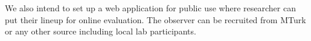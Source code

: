 \documentclass[11pt]{article}
\begin{document}
We also intend to set up a web application for public use where researcher can put their lineup for online evaluation. The observer can be recruited from MTurk or any other source including local lab participants. 


%
%
%
%
\end{document}
